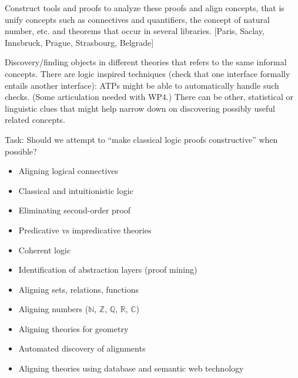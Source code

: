 \begin{workpackage}[id=alignment,wphases=0-48,type=RTD,
  short=Concept Alignment,%
  title=Concept Alignment,
  lead=Pra,
  PraRM=10]
\begin{wpdescription}
  Construct tools and proofs to analyze these proofs and align
  concepts, that is unify concepts such as connectives and
  quantifiers, the concept of natural number, etc. and theorems that
  occur in several libraries.  [Paris, Saclay, Innsbruck, Prague,
  Strasbourg, Belgrade]

  Discovery/finding objects in different theories that refers to the
  same informal concepts.  There are logic inspired techniques (check
  that one interface formally entails another interface): ATPs might
  be able to automatically handle such checks. (Some articulation
  needed with WP4.)  There can be other, statistical or linguistic
  clues that might help narrow down on discovering possibly useful
  related concepts.

\end{wpdescription}

Task: Should we attempt to ``make classical logic proofs
constructive'' when possible?

\begin{tasklist}
  \begin{task}[id=alignlogic,title=Alignment of logical foundations,lead=Lee]
    \begin{itemize}
    \item Aligning logical connectives
    \item Classical and intuitionistic logic
    \item Eliminating second-order proof
    \item Predicative vs impredicative theories
    \item Coherent logic
    \item Identification of abstraction layers (proof mining)
    \end{itemize}
  \end{task}
  
  \begin{task}[id=aligncasestudies,title=Case studies,lead=Str]
    \begin{itemize}
    \item Aligning sets, relations, functions
    \item Aligning numbers ($\mathbb{N}$, $\mathbb{Z}$, $\mathbb{Q}$,
      $\mathbb{R}$, $\mathbb{C}$)
    \item Aligning theories for geometry
    \end{itemize}
  \end{task}

  \begin{task}[id=aligntheories,title=Automated theory alignment,lead=Inr]
    \begin{itemize}
    \item Automated discovery of alignments
    \item Aligning theories using database and semantic web technology
    \end{itemize}
  \end{task}


\end{tasklist}
\end{workpackage}
